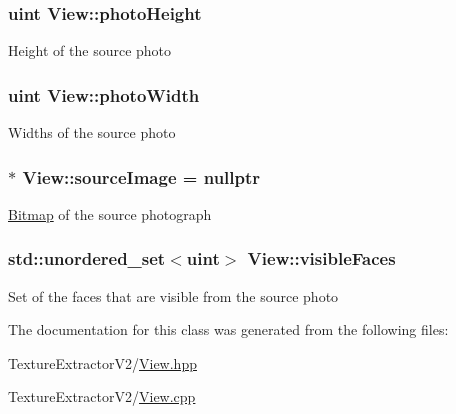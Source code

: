 \subsubsection[{photo\+Height}]{\setlength{\rightskip}{0pt plus 5cm}uint View\+::photo\+Height}\label{class_view_aa6390d1827dd3b222e0a91891c9ff05b}
Height of the source photo \hypertarget{class_view_a00c5c1d61a5056a52982e03a6f7f7c70}{}
\subsubsection[{photo\+Width}]{\setlength{\rightskip}{0pt plus 5cm}uint View\+::photo\+Width}\label{class_view_a00c5c1d61a5056a52982e03a6f7f7c70}
Widths of the source photo \hypertarget{class_view_a6694ecbe37c82f827cc5c861ea6544a7}{}
\subsubsection[{source\+Image}]{$\ast$ View\+::source\+Image = nullptr}\label{class_view_a6694ecbe37c82f827cc5c861ea6544a7}
\hyperlink{class_bitmap}{Bitmap} of the source photograph \hypertarget{class_view_a1c2f222c8f6060c2d3ecb7c08808fa91}{}
\subsubsection[{visible\+Faces}]{\setlength{\rightskip}{0pt plus 5cm}std\+::unordered\+\_\+set$<$uint$>$ View\+::visible\+Faces}\label{class_view_a1c2f222c8f6060c2d3ecb7c08808fa91}
Set of the faces that are visible from the source photo 

The documentation for this class was generated from the following files\+:\begin{DoxyCompactItemize}
\item 
Texture\+Extractor\+V2/\hyperlink{_view_8hpp}{View.\+hpp}\item 
Texture\+Extractor\+V2/\hyperlink{_view_8cpp}{View.\+cpp}\end{DoxyCompactItemize}
